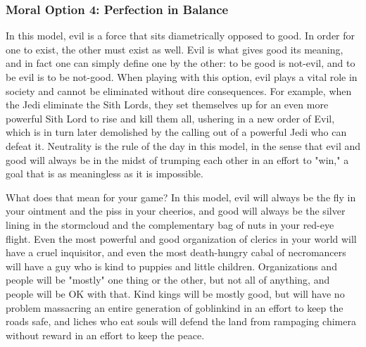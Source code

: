 \subsubsection{Moral Option 4: Perfection in Balance}
\vspace*{-8pt}

In this model, evil is a force that sits diametrically opposed to good. In order for one to exist, the other must exist as well. Evil is what gives good its meaning, and in fact one can simply define one by the other: to be good is not-evil, and to be evil is to be not-good. When playing with this option, evil plays a vital role in society and cannot be eliminated without dire consequences. For example, when the Jedi eliminate the Sith Lords, they set themselves up for an even more powerful Sith Lord to rise and kill them all, ushering in a new order of Evil, which is in turn later demolished by the calling out of a powerful Jedi who can defeat it. Neutrality is the rule of the day in this model, in the sense that evil and good will always be in the midst of trumping each other in an effort to "win," a goal that is as meaningless as it is impossible.

What does that mean for your game? In this model, evil will always be the fly in your ointment and the piss in your cheerios, and good will always be the silver lining in the stormcloud and the complementary bag of nuts in your red-eye flight. Even the most powerful and good organization of clerics in your world will have a cruel inquisitor, and even the most death-hungry cabal of necromancers will have a guy who is kind to puppies and little children. Organizations and people will be "mostly" one thing or the other, but not all of anything, and people will be OK with that. Kind kings will be mostly good, but will have no problem massacring an entire generation of goblinkind in an effort to keep the roads safe, and liches who eat souls will defend the land from rampaging chimera without reward in an effort to keep the peace.


